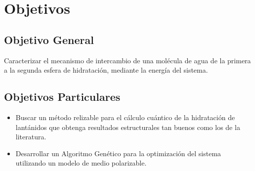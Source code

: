 \section{Objetivos}
\subsection{Objetivo General}
Caracterizar el mecanismo de intercambio de una mol\'ecula de 
agua de la primera a la segunda esfera de hidrataci\'on, mediante la
energ\'ia del sistema.
\subsection{Objetivos Particulares}
\begin{itemize}
 \item Buscar un m\'etodo relizable para el c\'alculo cu\'antico de 
 la hidrataci\'on de lant\'anidos que obtenga resultados 
 estructurales tan buenos como los de la literatura.
 \item Desarrollar un Algoritmo Gen\'etico para la optimizaci\'on del
 sistema utilizando un modelo de medio polarizable.
\end{itemize}


